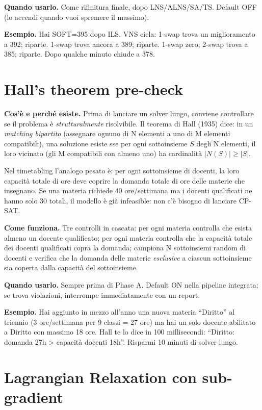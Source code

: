 \textbf{Quando usarlo.} Come rifinitura finale, dopo
LNS/ALNS/SA/TS. Default OFF (lo accendi quando vuoi spremere
il massimo).

\textbf{Esempio.} Hai SOFT=395 dopo ILS. VNS cicla: 1-swap
trova un miglioramento a 392; riparte. 1-swap trova ancora a
389; riparte. 1-swap zero; 2-swap trova a 385; riparte. Dopo
qualche minuto chiude a 378.

\section{Hall's theorem pre-check}

\textbf{Cos'\`e e perch\'e esiste.} Prima di lanciare un
solver lungo, conviene controllare se il problema \`e
\emph{strutturalmente} risolvibile. Il teorema di Hall (1935)
dice: in un \emph{matching bipartito} (assegnare ognuno di N
elementi a uno di M elementi compatibili), una soluzione
esiste sse per ogni sottoinsieme $S$ degli N elementi, il
loro vicinato (gli M compatibili con almeno uno) ha
cardinalit\`a $|N(S)| \geq |S|$.

Nel timetabling l'analogo pesato \`e: per ogni sottoinsieme di
docenti, la loro capacit\`a totale di ore deve coprire la
domanda totale di ore delle materie che insegnano. Se una
materia richiede 40 ore/settimana ma i docenti qualificati ne
hanno solo 30 totali, il modello \`e gi\`a infeasible: non
c'\`e bisogno di lanciare CP-SAT.

\textbf{Come funziona.} Tre controlli in cascata: per ogni
materia controlla che esista almeno un docente qualificato;
per ogni materia controlla che la capacit\`a totale dei
docenti qualificati copra la domanda; campiona N sottoinsiemi
random di docenti e verifica che la domanda delle materie
\emph{esclusive} a ciascun sottoinsieme sia coperta dalla
capacit\`a del sottoinsieme.

\textbf{Quando usarlo.} Sempre prima di Phase A. Default ON
nella pipeline integrata; se trova violazioni, interrompe
immediatamente con un report.

\textbf{Esempio.} Hai aggiunto in mezzo all'anno una nuova
materia ``Diritto'' al triennio (3 ore/settimana per 9 classi
= 27 ore) ma hai un solo docente abilitato a Diritto con
massimo 18 ore. Hall te lo dice in 100 millisecondi: ``Diritto:
domanda 27h > capacit\`a docenti 18h''. Risparmi 10 minuti di
solver lungo.

\section{Lagrangian Relaxation con sub-gradient}

